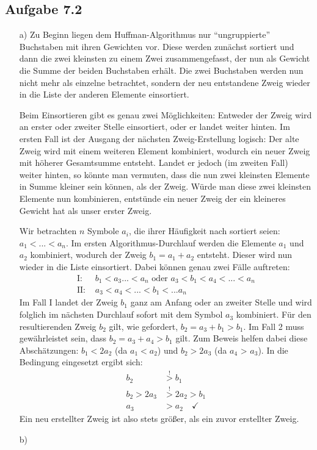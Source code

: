 \documentclass{article}
\begin{document}
    \subsection*{Aufgabe 7.2}
    \begin{enumerate}
        \item[a)]
        Zu Beginn liegen dem Huffman-Algorithmus nur "`ungruppierte"' Buchstaben mit ihren Gewichten vor. Diese werden zunächst sortiert und dann die zwei kleinsten zu einem Zwei zusammengefasst, der nun als Gewicht die Summe der beiden Buchstaben erhält. Die zwei Buchstaben werden nun nicht mehr als einzelne betrachtet, sondern der neu entstandene Zweig wieder in die Liste der anderen Elemente einsortiert. 
        
        Beim Einsortieren gibt es genau zwei Möglichkeiten: Entweder der Zweig wird an erster oder zweiter Stelle einsortiert, oder er landet weiter hinten. Im ersten Fall ist der Ausgang der nächsten Zweig-Erstellung logisch: Der alte Zweig wird mit einem weiteren Element kombiniert, wodurch ein neuer Zweig mit höherer Gesamtsumme entsteht. Landet er jedoch (im zweiten Fall) weiter hinten, so könnte man vermuten, dass die nun zwei kleinsten Elemente in Summe kleiner sein können, als der Zweig. Würde man diese zwei kleinsten Elemente nun kombinieren, entstünde ein neuer Zweig der ein kleineres Gewicht hat als unser erster Zweig. 

        Wir betrachten $n$ Symbole $a_i$, die ihrer Häufigkeit nach sortiert seien: $a_1 < ... < a_n$. Im ersten Algorithmus-Durchlauf werden die Elemente $a_1$ und $a_2$ kombiniert, wodurch der Zweig $b_1 = a_1 + a_2$ entsteht. Dieser wird nun wieder in die Liste einsortiert. Dabei können genau zwei Fälle auftreten:
        \begin{align*}
            \text{I: } &b_1 < a_3 ... < a_n \text{ oder } a_3 < b_1 < a_4 < ... < a_n \\
            \text{II: } &a_3 < a_4 < ... < b_1 < ... a_n 
        \end{align*}
        Im Fall I landet der Zweig $b_1$ ganz am Anfang oder an zweiter Stelle und wird folglich im nächsten Durchlauf sofort mit dem Symbol $a_3$ kombiniert. Für den resultierenden Zweig $b_2$ gilt, wie gefordert, $b_2 = a_3 + b_1 > b_1$.
        Im Fall 2 muss gewährleistet sein, dass $b_2 = a_3 + a_4 > b_1$ gilt. Zum Beweis helfen dabei diese Abschätzungen: $b_1 < 2a_2$ (da $a_1 < a_2$) und $b_2 > 2a_3$ (da $a_4$ > $a_3$). In die Bedingung eingesetzt ergibt sich:
        \begin{align*}
            b_2 &\stackrel{!}{>} b_1 \\
            b_2 > 2a_3 &\stackrel{!}{>} 2a_2 > b_1 \\
            a_3 &> a_2 \quad \checkmark
        \end{align*}
        Ein neu erstellter Zweig ist also stets größer, als ein zuvor erstellter Zweig. 
        \item[b)]
        
    \end{enumerate}
\end{document}
